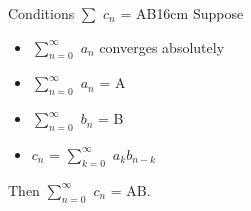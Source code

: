     \vspace{0.5cm}



    \begin{wtheorem}{Conditions $\sum$ $c_n$ = AB}{16cm}
        Suppose

        \begin{itemize}[leftmargin=1cm, itemsep=0.1cm]
            \item $\sum_{n=0}^{\infty}$ $a_n$ converges absolutely
            
            \item $\sum_{n=0}^{\infty}$ $a_n$ = A
            
            \item $\sum_{n=0}^{\infty}$ $b_n$ = B
            
            \item $c_n$ = $\sum_{k=0}^{\infty}$ $a_k b_{n-k}$ 
        \end{itemize}

        Then $\sum_{n=0}^{\infty}$ $c_n$ = AB.
    \end{wtheorem}

